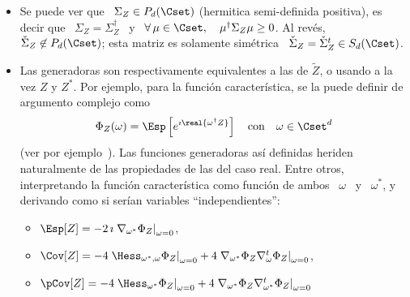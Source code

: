 \begin{itemize}
\begin{itemize}
\[    \]
    conteniendo todas las convarianzas, y por el otro lado,
    \[
    \Sigma_Z =  \left( \Sigma_X  + \Sigma_Y \right)  - \imath \left(  \Sigma_{X,Y} -
      \Sigma_{X,Y}^t \right)
    \]
    Se puede  ver que  la covarianza de  $Z$ no  contiene todos los  terminos de
    orden  2.  Por  eso, se  define  tambi\'en la  {\em pseudo-covarianza},  sin
    terminos conjugados,
    \[
    \check{\Sigma}_Z \equiv \pCov[Z] \equiv \Esp\left[ (Z-m_Z) (Z-m_Z)^t \right]
    \]
    Ahora, se puede ver que
    \[
    \check{\Sigma}_Z  =  \left( \Sigma_X  -  \Sigma_Y  \right)  + \imath  \left(
      \Sigma_{X,Y} + \Sigma_{X,Y}^t \right)
    \]
    Entonces,  se  recupera  inmediatamente   $\Sigma_X,  \:  \Sigma_Y$  \  y  \
    $\Sigma_{X,Y}$  \  a  partir  de  \ $\Sigma_Z$  \  y  \  $\check{\Sigma}_Z$;
    Claramente,   los   momentos   centrales   de   orden  2   son   dados   por
    \underline{ambas}  \  $\Sigma_Z$  \   y  \  $\check{\Sigma}_Z$.
  \end{itemize}
  Los momentos  as\'i definidos heriden  naturalmente de las propiedades  de las
  del caso real.
%
\item  Se puede  ver que  \ $\Sigma_Z  \in P_d(\Cset)$  (hermitica semi-definida
  positiva), es decir que \ $\Sigma_Z = \Sigma_Z^\dag$ \ y \ $\forall \, \mu \in
  \Cset,  \quad \mu^\dag  \Sigma_Z \mu  \ge 0$.   Al  rev\'es, $\check{\Sigma}_Z
  \not\in P_d(\Cset)$; esta matriz  es solamente sim\'etrica \ $\check{\Sigma}_Z
  = \check{\Sigma}_Z^t \in S_d(\Cset)$.
%
\item Las generadoras son respectivamente equivalentes a las de $\widetilde{Z}$,
  o  usando   a  la  vez   $Z$  y  $Z^*$.    Por  ejemplo,  para   la  funci\'on
  caracter\'istica, se la puede definir de argumento complejo como
  \[
  \Phi_Z(\omega)  =  \Esp\left[ e^{\imath  \real{\omega^\dag  Z}} \right]  \quad
  \mbox{con} \quad \omega \in \Cset^d
  \]
  (ver  por  ejemplo~\cite[Cap.~17]{Lap17}).   Las funciones  generadoras  as\'i
  definidas heriden naturalmente de las  propiedades de las del caso real. Entre
  otros, interpretando  la funci\'on caracter\'istica como funci\'on  de ambos \
  $\omega$ \ y \ $\omega^*$, y derivando como si ser\'ian variables ``independientes'':
  \begin{itemize}
  \item $\Esp[Z]  = - 2 \, \imath  \left. \nabla_{\omega^*} \Phi_Z  \right|_{\omega =
      0}$,
  \item $\Cov[Z] = - 4 \left. \Hess_{\omega^*,\omega} \Phi_Z \right|_{\omega = 0} +
    4 \left. \nabla_{\omega^*}  \Phi_Z \nabla_{\omega}^t \Phi_Z  \right|_{\omega =
      0}$,
  \item  $\pCov[Z] =  - 4 \left.  \Hess_{\omega^*}  \Phi_Z \right|_{\omega  = 0}  +
    4 \left. \nabla_{\omega^*} \Phi_Z \nabla_{\omega^*}^t \Phi_Z \right|_{\omega =
      0}$
  \end{itemize}
\end{itemize}

